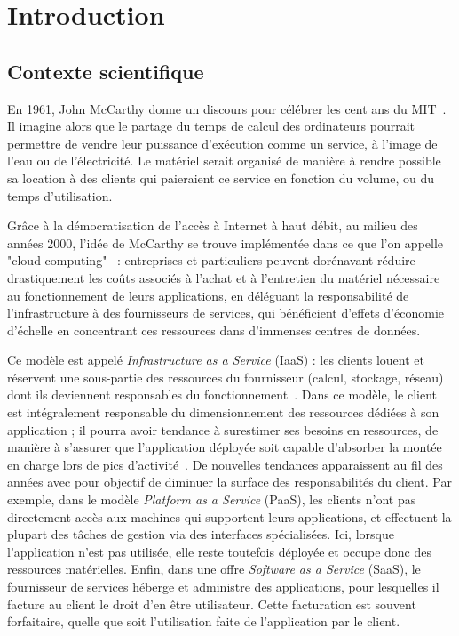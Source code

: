 \chapter{Introduction}

\section{Contexte scientifique}

En 1961, John McCarthy donne un discours pour célébrer les cent ans du MIT~\cite{greenberger1962management}. Il imagine alors que le partage du temps de calcul des ordinateurs pourrait permettre de vendre leur puissance d'exécution comme un service, à l'image de l'eau ou de l'électricité. Le matériel serait organisé de manière à rendre possible sa location à des clients qui paieraient ce service en fonction du volume, ou du temps d'utilisation.

Grâce à la démocratisation de l'accès à Internet à haut débit, au milieu des années 2000, l'idée de McCarthy se trouve implémentée dans ce que l'on appelle "cloud computing"~\cite{hayesCloudComputing2008} : entreprises et particuliers peuvent dorénavant réduire drastiquement les coûts associés à l'achat et à l'entretien du matériel nécessaire au fonctionnement de leurs applications, en déléguant la responsabilité de l'infrastructure à des fournisseurs de services, qui bénéficient d'effets d'économie d'échelle en concentrant ces ressources dans d'immenses centres de données.

Ce modèle est appelé \textit{Infrastructure as a Service} (IaaS) : les clients louent et réservent une sous-partie des ressources du fournisseur (calcul, stockage, réseau) dont ils deviennent responsables du fonctionnement~\cite{mellNISTDefinitionCloud}. Dans ce modèle, le client est intégralement responsable du dimensionnement des ressources dédiées à son application ; il pourra avoir tendance à surestimer ses besoins en ressources, de manière à s'assurer que l'application déployée soit capable d'absorber la montée en charge lors de pics d'activité~\cite{takMoveNotMove}. De nouvelles tendances apparaissent au fil des années avec pour objectif de diminuer la surface des responsabilités du client. Par exemple, dans le modèle \textit{Platform as a Service} (PaaS), les clients n'ont pas directement accès aux machines qui supportent leurs applications, et effectuent la plupart des tâches de gestion via des interfaces spécialisées. Ici, lorsque l'application n'est pas utilisée, elle reste toutefois déployée et occupe donc des ressources matérielles. Enfin, dans une offre \textit{Software as a Service} (SaaS), le fournisseur de services héberge et administre des applications, pour lesquelles il facture au client le droit d'en être utilisateur. Cette facturation est souvent forfaitaire, quelle que soit l'utilisation faite de l'application par le client.

